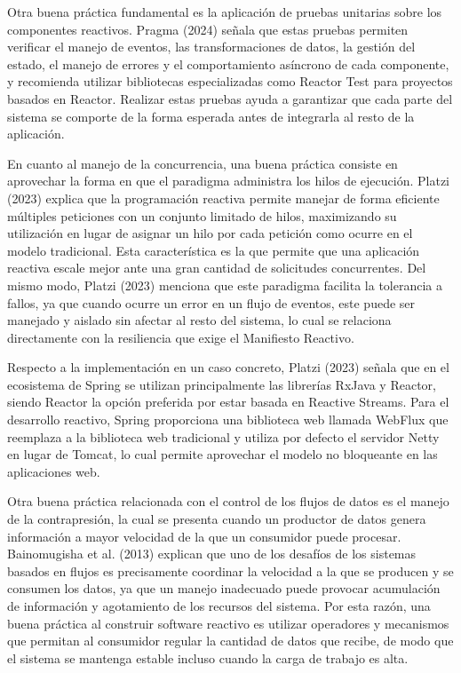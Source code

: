 \documentclass[12pt,letterpaper]{article}
\begin{document}
Otra buena práctica fundamental es la aplicación de pruebas unitarias sobre los componentes reactivos. Pragma (2024) señala que estas pruebas permiten verificar el manejo de eventos, las transformaciones de datos, la gestión del estado, el manejo de errores y el comportamiento asíncrono de cada componente, y recomienda utilizar bibliotecas especializadas como Reactor Test para proyectos basados en Reactor. Realizar estas pruebas ayuda a garantizar que cada parte del sistema se comporte de la forma esperada antes de integrarla al resto de la aplicación.

En cuanto al manejo de la concurrencia, una buena práctica consiste en aprovechar la forma en que el paradigma administra los hilos de ejecución. Platzi (2023) explica que la programación reactiva permite manejar de forma eficiente múltiples peticiones con un conjunto limitado de hilos, maximizando su utilización en lugar de asignar un hilo por cada petición como ocurre en el modelo tradicional. Esta característica es la que permite que una aplicación reactiva escale mejor ante una gran cantidad de solicitudes concurrentes. Del mismo modo, Platzi (2023) menciona que este paradigma facilita la tolerancia a fallos, ya que cuando ocurre un error en un flujo de eventos, este puede ser manejado y aislado sin afectar al resto del sistema, lo cual se relaciona directamente con la resiliencia que exige el Manifiesto Reactivo.

Respecto a la implementación en un caso concreto, Platzi (2023) señala que en el ecosistema de Spring se utilizan principalmente las librerías RxJava y Reactor, siendo Reactor la opción preferida por estar basada en Reactive Streams. Para el desarrollo reactivo, Spring proporciona una biblioteca web llamada WebFlux que reemplaza a la biblioteca web tradicional y utiliza por defecto el servidor Netty en lugar de Tomcat, lo cual permite aprovechar el modelo no bloqueante en las aplicaciones web.

Otra buena práctica relacionada con el control de los flujos de datos es el manejo de la contrapresión, la cual se presenta cuando un productor de datos genera información a mayor velocidad de la que un consumidor puede procesar. Bainomugisha et al. (2013) explican que uno de los desafíos de los sistemas basados en flujos es precisamente coordinar la velocidad a la que se producen y se consumen los datos, ya que un manejo inadecuado puede provocar acumulación de información y agotamiento de los recursos del sistema. Por esta razón, una buena práctica al construir software reactivo es utilizar operadores y mecanismos que permitan al consumidor regular la cantidad de datos que recibe, de modo que el sistema se mantenga estable incluso cuando la carga de trabajo es alta.
\end{document}
